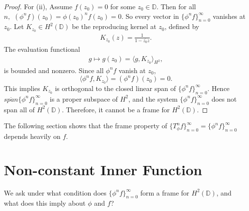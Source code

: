 \documentclass[12pt,titlepage]{amsart}
\theoremstyle{definition}
\theoremstyle{remark}
\begin{document}
\begin{proof}
For (ii), Assume $f(z_0) = 0$ for some $z_0 \in \mathbb{D}$. Then
for all $n, \,\ (\phi^n f)(z_0) = \phi(z_0)^n f(z_0) = 0$. So
every vector in  $\{\phi^n f\}_{n=0}^\infty$ vanishes at $z_0$.
Let $K_{z_0} \in H^2(\mathbb{D})$ be the reproducing kernel at
$z_0$, defined by
\begin{eqnarray*}
K_{z_0}(z) = \frac{1}{1 - \overline{z_0} z}.
\end{eqnarray*}
The evaluation functional
\begin{eqnarray*}
g \mapsto g(z_0) = \langle g, K_{z_0} \rangle_{H^2},
\end{eqnarray*}
is bounded and nonzero. Since all $\phi^n f$ vanish at $z_0$,
$$\langle \phi^n f, K_{z_0} \rangle = (\phi^n f)(z_0) = 0.$$ This
implies $K_{z_0}$ is orthogonal to the closed linear span of
$\{\phi^n f\}_{n=0}^\infty$. Hence
$\overline{span}\{\phi^nf\}_{n=0}^\infty$ is a proper subspace of
$H^2$, and the system $\{\phi^n f\}_{n=0}^\infty$ does not span
all of $H^2(\mathbb{D})$. Therefore, it cannot be a frame for
$H^2(\mathbb{D})$.
\end{proof}
The following section shows that the frame property of
$\{T_{\phi}^nf\}_{ n=0 }^{\infty}=\{\phi^n f\}_{n=0}^\infty$
depends heavily on $f$.
\section{\textbf{Non-constant Inner Function}}


We ask under what condition does $\{\phi^n f \}_{n=0}^\infty$ form
a frame for $H^2(\mathbb{D})$, and what does this imply about
$\phi$ and $f$?
\end{document}

